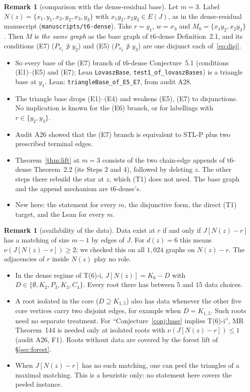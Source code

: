 \documentclass[11pt]{amsart}
\theoremstyle{definition}
\newtheorem{remark}[theorem]{Remark}
\begin{document}
\begin{remark}[comparison with the dense-residual base]\label{rem:compare}
Let $m=3$. Label $N(z)=\{x_1,y_1,x_2,y_2,x_3,y_3\}$ with $x_1y_2,x_2y_3\in E(J)$, as in the
dense-residual manuscript (\texttt{manuscripts/t6-dense}). Take $r=y_1$, $w=x_3$ and
$M_0=\{x_1y_2,x_2y_3\}$. Then $M$ is \emph{the same graph} as the base graph of t6-dense Definition~2.1,
and its conditions (E7) ($P_{x_1}\not\ni y_2$) and (E5) ($P_{x_2}\not\ni y_3$) are one disjunct each
of~\eqref{eq:disj}.
\begin{itemize}[leftmargin=*]
\item So every base of the (E7) branch of t6-dense Conjecture~5.1 (conditions (E1)--(E5) and (E7);
Lean \texttt{LovaszBase}, \texttt{test1\_of\_lovaszBases}) is a triangle base at $y_1$. Lean:
\texttt{triangleBase\_of\_E5\_E7}, from audit A28.
\item The triangle base drops (E1)--(E4) and weakens (E5), (E7) to disjunctions. No implication is
known for the (E6) branch, or for labellings with $r\in\{y_2,y_3\}$.
\item Audit A26 showed that the (E7) branch is equivalent to STL-P plus two prescribed terminal edges.
\item Theorem~\ref{thm:lift} at $m=3$ consists of the two chain-edge appends of t6-dense Theorem~2.2
(its Steps 2 and 4), followed by deleting $z$. The other steps there rebuild the star at $z$, which
(T1) does not need. The base graph and the append mechanism are t6-dense's.
\item New here: the statement for every $m$, the disjunctive form, the direct (T1) target, and the
Lean for every $m$.
\end{itemize}
\end{remark}

\begin{remark}[availability of the data]\label{rem:avail}
Data exist at $r$ if and only if $J[N(z)-r]$ has a matching of size $m-1$ by edges of $J$. For
$d(z)=6$ this means $\nu(J[N(z)-r])\ge2$; we checked this on all $1{,}024$ graphs on $N(z)-r$. The
adjacencies of $r$ inside $N(z)$ play no role.
\begin{itemize}[leftmargin=*]
\item In the dense regime of T(6)-i, $J[N(z)]=K_6-D$ with $D\in\{\emptyset,K_2,P_3,K_3,C_4\}$. Every root
there has between $5$ and $15$ data choices.
\item A root isolated in the core ($D\supseteq K_{1,5}$) also has data whenever the other five
core vertices carry two disjoint edges, for example when $D=K_{1,5}$. Such roots need no separate
treatment. For ``Conjecture~\ref{conj:base} implies T(6)-i'', MR Theorem~144 is needed only at
isolated roots with $\nu(J[N(z)-r])\le1$ (audit A26, F1). Roots without data are covered by the
forest lift of \S\ref{sec:forest}.
\item When $J[N(z)-r]$ has no such matching, one can peel the triangles of a maximal matching. This is
a heuristic only: no statement here covers the peeled instance.
\end{itemize}
\end{remark}
\end{document}
